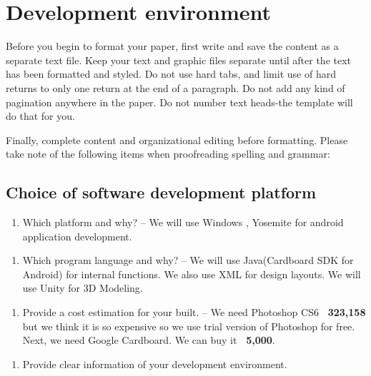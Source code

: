 \documentclass{article}
\begin{document}
\noindent \textit{}

\noindent \textit{}


\section{ Development environment}

Before you begin to format your paper, first write and save the content as a separate text file. Keep your text and graphic files separate until after the text has been formatted and styled. Do not use hard tabs, and limit use of hard returns to only one return at the end of a paragraph. Do not add any kind of pagination anywhere in the paper. Do not number text heads-the template will do that for you.

Finally, complete content and organizational editing before formatting. Please take note of the following items when proofreading spelling and grammar:


\subsection{ Choice of software development platform}

\begin{enumerate}
\item \textit{ }Which platform and why? -- We will use Windows , Yosemite for android application development.
\end{enumerate}

\noindent 

\begin{enumerate}
\item  Which  program language and why? -- We will use Java(Cardboard SDK for Android) for internal functions. We also use XML for design layouts. We will use Unity for 3D Modeling.
\end{enumerate}

\noindent 

\begin{enumerate}
\item  Provide a cost estimation for your built. -- We need Photoshop CS6 \textbf{\ 323,158  }but we think it is so expensive so we use trial version of Photoshop for free. Next, we need Google Cardboard. We can buy it  \textbf{\ 5,000}. 
\end{enumerate}

\noindent 

\begin{enumerate}
\item  Provide clear information of your development environment.
\end{enumerate}
\end{document}
